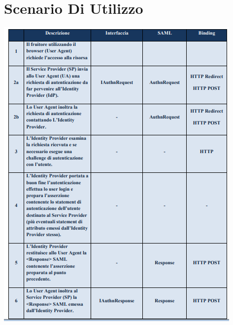 \section{Scenario Di Utilizzo}
\begin{center}
	\includegraphics[scale = 1.3]{./res/images/ScenarioUsoSPID.PNG}
\end{center}
